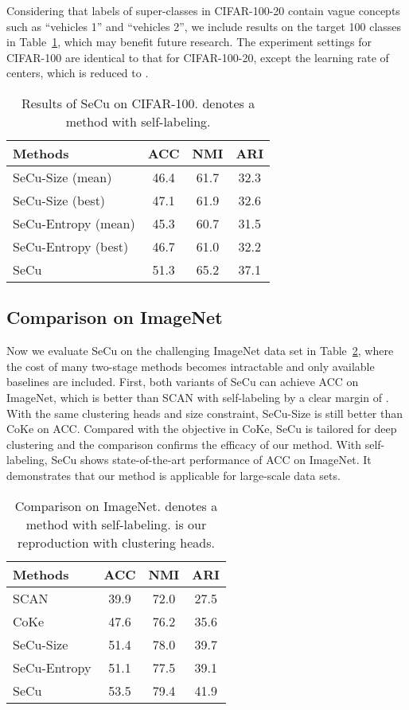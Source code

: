 \documentclass[10pt,twocolumn,letterpaper]{article}
\begin{document}
Considering that labels of super-classes in CIFAR-100-20 contain vague concepts such as ``vehicles 1'' and ``vehicles 2'', we include results on the target 100 classes in Table~\ref{ta:cf100}, which may benefit future research. The experiment settings for CIFAR-100 are identical to that for CIFAR-100-20, except the learning rate of centers, which is reduced to .

\begin{table}[!ht]
\centering
\begin{tabular}{|l|c|c|c|}\hline
Methods&ACC&NMI&ARI\\\hline
SeCu-Size (mean)&46.4&61.7&32.3 \\
SeCu-Size (best)&47.1&61.9&32.6 \\
SeCu-Entropy (mean) & 45.3&60.7&31.5\\
SeCu-Entropy (best) & 46.7&61.0&32.2\\
SeCu&51.3&65.2&37.1\\\hline
\end{tabular}
\caption{Results of SeCu on CIFAR-100.  denotes a method with self-labeling.}\label{ta:cf100}
\end{table}

\subsection{Comparison on ImageNet}
Now we evaluate SeCu on the challenging ImageNet data set in Table~\ref{ta:imagenet}, where the cost of many two-stage methods becomes intractable and only available baselines are included. First, both variants of SeCu can achieve  ACC on ImageNet, which is better than SCAN with self-labeling by a clear margin of . With the same  clustering heads and size constraint, SeCu-Size is still  better than CoKe on ACC. Compared with the objective in CoKe, SeCu is tailored for deep clustering and the comparison confirms the efficacy of our method. With self-labeling, SeCu shows state-of-the-art performance of  ACC on ImageNet. It demonstrates that our method is applicable for large-scale data sets. 

\begin{table}[!ht]
\centering
\begin{tabular}{|l|c|c|c|}\hline
Methods&ACC&NMI&ARI\\\hline
SCAN&39.9&72.0&27.5\\
CoKe&47.6&76.2&35.6\\
SeCu-Size&51.4&78.0&39.7\\
SeCu-Entropy&51.1&77.5&39.1\\
SeCu&53.5&79.4&41.9\\\hline
\end{tabular}
\caption{Comparison on ImageNet.  denotes a method with self-labeling.  is our reproduction with  clustering heads.}\label{ta:imagenet}
\end{table}
\end{document}

